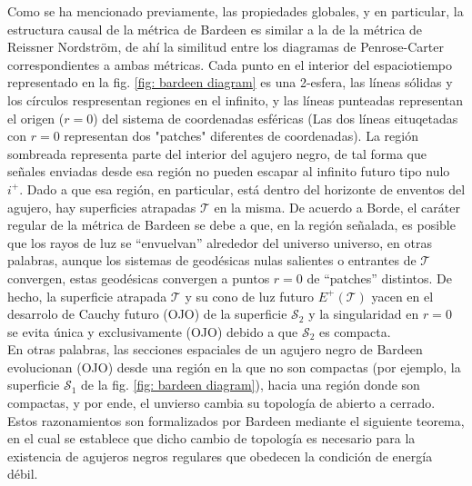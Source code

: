\documentclass{article}
\numberwithin{equation}{section}
\begin{document}
Como se ha mencionado previamente, las propiedades globales, y en particular, la estructura causal de la métrica de Bardeen es similar a la de la métrica de Reissner Nordström, de ahí la similitud entre los diagramas de Penrose-Carter correspondientes a ambas métricas. Cada punto en el interior del espaciotiempo representado en la fig. \ref{fig: bardeen diagram} es una 2-esfera, las líneas sólidas y los círculos respresentan regiones en el infinito, y las líneas punteadas representan el origen ($r = 0$) del sistema de coordenadas esféricas (Las dos líneas eituqetadas con $r = 0$ representan dos "patches" diferentes de coordenadas). La región sombreada representa parte del interior del agujero negro, de tal forma que señales enviadas desde esa región no pueden escapar al infinito futuro tipo nulo $i^{+}$. Dado a que esa región, en particular, está dentro del horizonte de enventos del agujero, hay superficies atrapadas $\mathcal{T}$ en la misma. De acuerdo a Borde, el caráter regular de la métrica de Bardeen se debe a que, en la región señalada, es posible que los rayos de luz se ``envuelvan'' alrededor del universo universo, en otras palabras, aunque los sistemas de geodésicas nulas salientes o entrantes de $\mathcal{T}$ convergen, estas geodésicas convergen a puntos $r = 0$ de ``patches'' distintos. De hecho, la superficie atrapada $\mathcal{T}$ y su cono de luz futuro $E^{+}(\mathcal{T})$ yacen en el desarrolo de Cauchy futuro (OJO) de la superficie $\mathcal{S}_{2}$ y la singularidad en $r = 0$ se evita única y exclusivamente (OJO) debido a que $\mathcal{S}_{2}$ es compacta.\\

En otras palabras, las secciones espaciales de un agujero negro de Bardeen evolucionan (OJO) desde una región en la que no son compactas (por ejemplo, la superficie $\mathcal{S}_{1}$ de la fig. \ref{fig: bardeen diagram}), hacia una región donde son compactas, y por ende, el unvierso cambia su topología de abierto a cerrado. Estos razonamientos son formalizados por Bardeen mediante el siguiente teorema, en el cual se establece que dicho cambio de topología es necesario para la existencia de agujeros negros regulares que obedecen la condición de energía débil.
\end{document}

